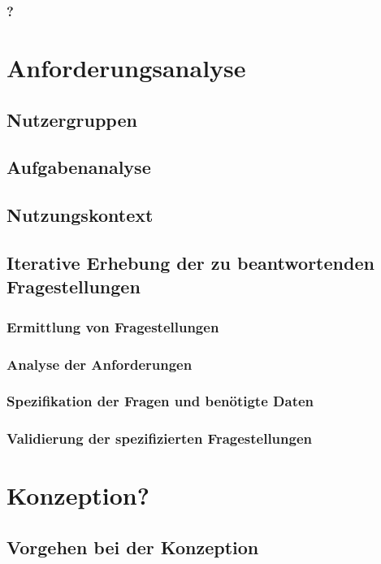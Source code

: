 \documentclass[11pt]{article}
\begin{document}
\subsubsection{?}


\section{Anforderungsanalyse}
\lipsum[1-26]
\subsection{Nutzergruppen}
\subsection{Aufgabenanalyse}
\subsection{Nutzungskontext}
\subsection{Iterative Erhebung der zu beantwortenden Fragestellungen}
\subsubsection{Ermittlung von Fragestellungen}
\subsubsection{Analyse der Anforderungen}
\subsubsection{Spezifikation der Fragen und benötigte Daten}
\subsubsection{Validierung der spezifizierten Fragestellungen}

\section{Konzeption?}
\lipsum[1-28]
\subsection{Vorgehen bei der Konzeption}
\end{document}

